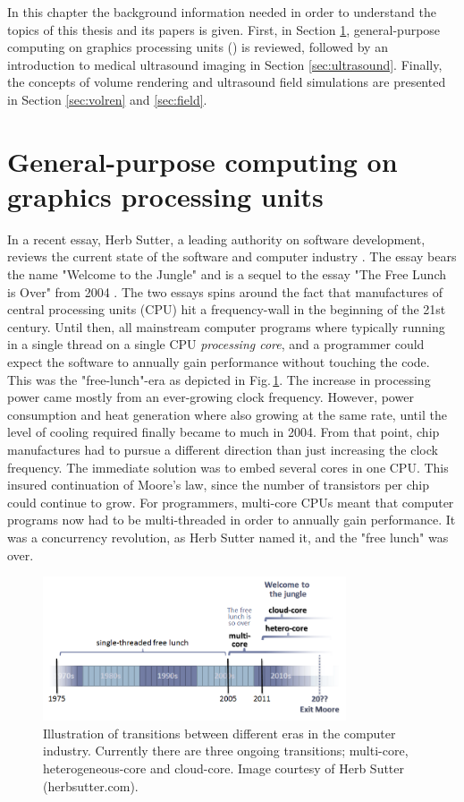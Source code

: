 %

In this chapter the background information needed in order to understand the topics of this thesis and its papers is given. First, in Section \ref{sec:gpgpu}, general-purpose computing on graphics processing units () is reviewed, followed by an introduction to medical ultrasound imaging in Section \ref{sec:ultrasound}. Finally, the concepts of volume rendering and ultrasound field simulations are presented in Section \ref{sec:volren} and \ref{sec:field}.

\section{General-purpose computing on graphics processing units}\label{sec:gpgpu}
In a recent essay, Herb Sutter, a leading authority on software development, reviews the current state of the software and computer industry \cite{HerbSutter}. The essay bears the name "Welcome to the Jungle" and is a sequel to the essay "The Free Lunch is Over" from 2004 \cite{HerbSuttera}. The two essays spins around the fact that manufactures of central processing units (CPU) hit a frequency-wall in the beginning of the 21st century. Until then, all mainstream computer programs where typically running in a single thread on a single CPU \textit{processing core}, and a programmer could expect the software to annually gain performance without touching the code. This was the "free-lunch"-era as depicted in Fig.\,\ref{fig:jungle}. The increase in processing power came mostly from an ever-growing clock frequency. However, power consumption and heat generation where also growing at the same rate, until the level of cooling required finally became to much in 2004.  From that point, chip manufactures had to pursue a different direction  than just increasing the clock frequency. The immediate solution was to embed several cores in one CPU. This insured continuation of Moore's law, since the number of transistors per chip could continue to grow. For programmers, multi-core CPUs meant that computer programs now had to be multi-threaded in order to annually gain performance. It was a concurrency revolution, as Herb Sutter named it, and  the "free lunch" was over.

\begin{figure}
\centering
\includegraphics[width=0.8\textwidth]{img/free_lunsh.png}
\caption{Illustration of transitions between different eras in the computer industry. Currently there are three ongoing transitions; multi-core, heterogeneous-core and cloud-core. Image courtesy of Herb Sutter (herbsutter.com).}
\label{fig:jungle}
\end{figure}

